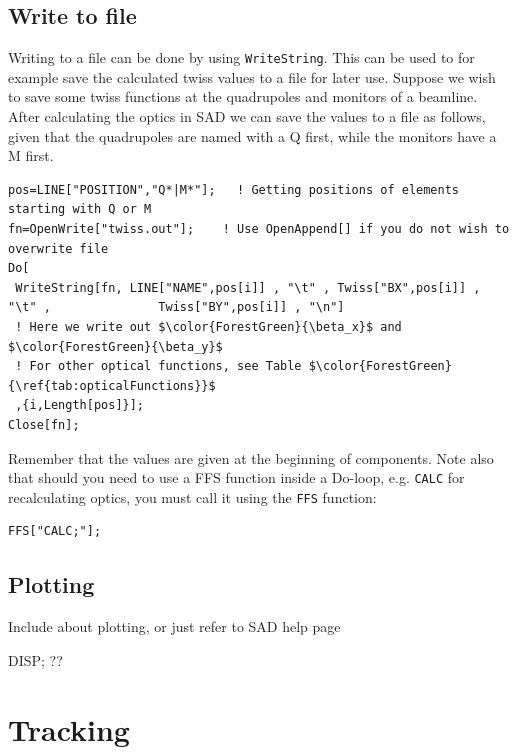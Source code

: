 \documentclass{article}
\begin{document}
\subsection{Write to file}
Writing to a file can be done by using \texttt{WriteString}. This can be used to for example save the calculated twiss values to a file for later use. Suppose we wish to save some twiss functions at the quadrupoles and monitors of a beamline.  After calculating the optics in SAD we can save the values to a file as follows, given that the quadrupoles are named with a Q first, while the monitors have a M first.
\begin{lstlisting}[mathescape=true]
pos=LINE["POSITION","Q*|M*"];	! Getting positions of elements starting with Q or M
fn=OpenWrite["twiss.out"];    ! Use OpenAppend[] if you do not wish to overwrite file
Do[                                    
 WriteString[fn, LINE["NAME",pos[i]] , "\t" , Twiss["BX",pos[i]] , "\t" ,               Twiss["BY",pos[i]] , "\n"]
 ! Here we write out $\color{ForestGreen}{\beta_x}$ and $\color{ForestGreen}{\beta_y}$
 ! For other optical functions, see Table $\color{ForestGreen}{\ref{tab:opticalFunctions}}$
 ,{i,Length[pos]}];
Close[fn];
\end{lstlisting}
Remember that the values are given at the beginning of components.
Note also that should you need to use a FFS function inside a Do-loop, e.g. \texttt{CALC} for recalculating optics, you must call it using the \texttt{FFS} function:
\begin{lstlisting}
FFS["CALC;"];
\end{lstlisting}


\subsection{Plotting}
Include about plotting, or just refer to SAD help page

DISP; ??


\section{Tracking}
\end{document}
